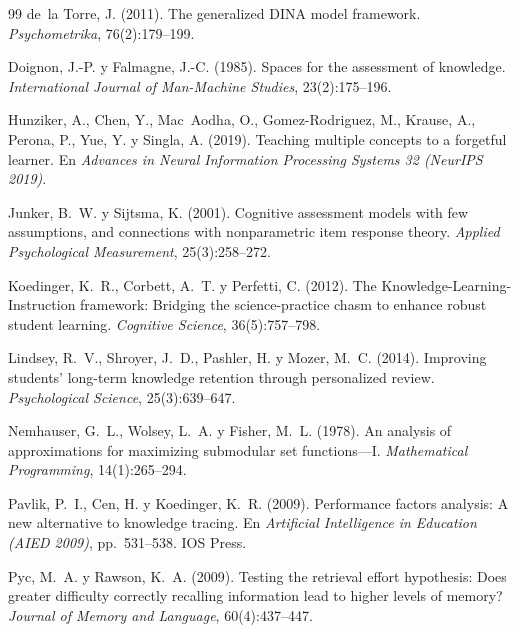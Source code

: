 \begin{thebibliography}{99}
de~la Torre, J. (2011).
\newblock The generalized DINA model framework.
\newblock \emph{Psychometrika}, 76(2):179--199.

Doignon, J.-P. y Falmagne, J.-C. (1985).
\newblock Spaces for the assessment of knowledge.
\newblock \emph{International Journal of Man-Machine Studies}, 23(2):175--196.

Hunziker, A., Chen, Y., Mac~Aodha, O., Gomez-Rodriguez, M., Krause, A., Perona, P., Yue, Y. y Singla, A. (2019).
\newblock Teaching multiple concepts to a forgetful learner.
\newblock En \emph{Advances in Neural Information Processing Systems 32 (NeurIPS 2019)}.

Junker, B.~W. y Sijtsma, K. (2001).
\newblock Cognitive assessment models with few assumptions, and connections with nonparametric item response theory.
\newblock \emph{Applied Psychological Measurement}, 25(3):258--272.

Koedinger, K.~R., Corbett, A.~T. y Perfetti, C. (2012).
\newblock The Knowledge-Learning-Instruction framework: Bridging the science-practice chasm to enhance robust student learning.
\newblock \emph{Cognitive Science}, 36(5):757--798.

Lindsey, R.~V., Shroyer, J.~D., Pashler, H. y Mozer, M.~C. (2014).
\newblock Improving students' long-term knowledge retention through personalized review.
\newblock \emph{Psychological Science}, 25(3):639--647.

Nemhauser, G.~L., Wolsey, L.~A. y Fisher, M.~L. (1978).
\newblock An analysis of approximations for maximizing submodular set functions---I.
\newblock \emph{Mathematical Programming}, 14(1):265--294.

Pavlik, P.~I., Cen, H. y Koedinger, K.~R. (2009).
\newblock Performance factors analysis: A new alternative to knowledge tracing.
\newblock En \emph{Artificial Intelligence in Education (AIED 2009)}, pp.~531--538. IOS Press.

Pyc, M.~A. y Rawson, K.~A. (2009).
\newblock Testing the retrieval effort hypothesis: Does greater difficulty correctly recalling information lead to higher levels of memory?
\newblock \emph{Journal of Memory and Language}, 60(4):437--447.


\end{thebibliography}
